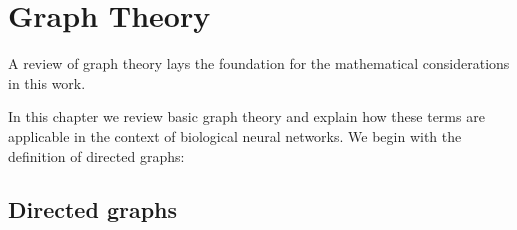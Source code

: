 \chapter{Graph Theory}\label{ch:Graph_theory} 

A review of graph theory lays the foundation for the mathematical
considerations in this work. 

 In this chapter we review basic graph
theory and explain how these terms are applicable in the context of
biological neural networks. We begin with the definition of directed
graphs: %


  \section{Directed graphs}\label{sec:directed_graphs}





